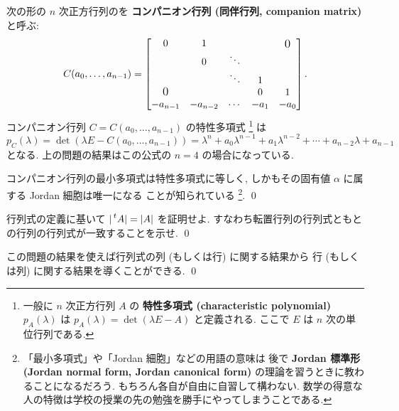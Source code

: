 \documentclass[12pt,twoside]{jarticle}
\begin{document}
\begin{guide}[コンパニオン行列]
  \label{guide:companion-matrix}
  次の形の $n$ 次正方行列のを {\bf コンパニオン行列 (同伴行列, 
  companion matrix)} と呼ぶ:
  \begin{equation*}
    C(a_0,\dots,a_{n-1}) =
    \begin{bmatrix}
      0         &    1     &        &      & \bigzerou \\
                &    0     & \ddots &      & \\
                &          & \ddots &  1   & \\
      \bigzerol &          &        &  0   &  1 \\
      -a_{n-1}  & -a_{n-2} & \cdots & -a_1 & -a_0 \\
    \end{bmatrix}.
  \end{equation*}
  コンパニオン行列 $C = C(a_0,\dots,a_{n-1})$ の特性多項式%
  \footnote{一般に $n$ 次正方行列 $A$ の
    {\bf 特性多項式 (characteristic polynomial)} $p_A(\lambda)$ 
    は $p_A(\lambda)=\det(\lambda E - A)$ と定義される.
    ここで $E$ は $n$ 次の単位行列である.}%
  は
  \begin{equation*}
    p_C(\lambda)
    = \det(\lambda E - C(a_0,\ldots,a_{n-1}))
    = \lambda^n + a_0\lambda^{n-1} + a_1\lambda^{n-2}
    + \cdots + a_{n-2}\lambda + a_{n-1}
  \end{equation*}
  となる. 上の問題の結果はこの公式の $n=4$ の場合になっている.
  
  コンパニオン行列の最小多項式は特性多項式に等しく,
  しかもその固有値 $\alpha$ に属する Jordan 細胞は唯一になる
  ことが知られている%
  \footnote{「最小多項式」や「Jordan 細胞」などの用語の意味は
    後で {\bf Jordan 標準形 (Jordan normal form, Jordan canonical form)} 
    の理論を習うときに教わることになるだろう.
    もちろん各自が自由に自習して構わない.
    数学の得意な人の特徴は学校の授業の先の勉強を勝手にやってしまうことである.}.
  \qed
\end{guide}


\begin{question}[転置行列の行列式]
  \label{q:transpose-det}
  行列式の定義に基いて $|\tp{A}|=|A|$ を証明せよ. 
  すなわち転置行列の行列式ともとの行列の行列式が一致することを示せ. 
  \qed
\end{question}

\begin{rem}
  この問題の結果を使えば行列式の列 (もしくは行) に関する結果から
  行 (もしくは列) に関する結果を導くことができる. \qed
\end{rem}
\end{document}

